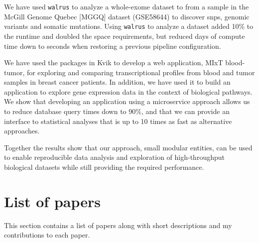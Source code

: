 We have used \texttt{walrus} to analyze a whole-exome dataset to from a sample
in the McGill Genome Quebec [MGGQ] dataset (GSE58644)\cite{tofigh2014prognostic}
to discover \glspl{snp}, genomic variants and somatic mutations. Using
\texttt{walrus} to analyze a dataset added 10\% to the runtime and doubled the
space requirements, but reduced days of compute time down to seconds when
restoring a previous pipeline configuration. 

We have used the packages in Kvik to develop a web application, MIxT
blood-tumor, for exploring and comparing transcriptional profiles from blood and
tumor samples in breast cancer patients.  In addition, we have used it to build
an application to explore gene expression data in the context of biological
pathways. We show that developing an application using a microservice approach
allows us to reduce database query times down to 90\%, and that we can provide
an interface to statistical analyses that is up to 10 times as fast as
alternative approaches. 

Together the results show that our approach, small modular entities, can be used
to enable reproducible data analysis and exploration of high-throughput
biological datasets while still providing the required performance. 

\section{List of papers} 
This section contains a list of papers along with short descriptions and my
contributions to each paper. 

